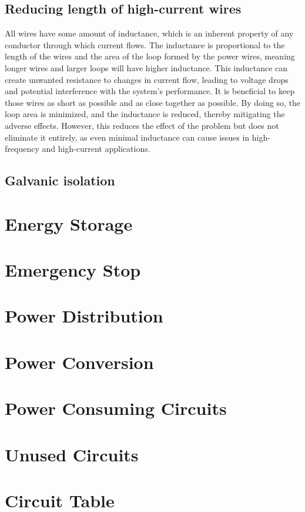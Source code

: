 \subsection{Reducing length of high-current wires}

All wires have some amount of inductance, which is an inherent property of any conductor through which current flows. The inductance is proportional to the length of the wires and the area of the loop formed by the power wires, meaning longer wires and larger loops will have higher inductance. This inductance can create unwanted resistance to changes in current flow, leading to voltage drops and potential interference with the system's performance. It is beneficial to keep those wires as short as possible and as close together as possible. By doing so, the loop area is minimized, and the inductance is reduced, thereby mitigating the adverse effects. However, this reduces the effect of the problem but does not eliminate it entirely, as even minimal inductance can cause issues in high-frequency and high-current applications.

\subsection{Galvanic isolation}




\section{Energy Storage}

\section{Emergency Stop}

\section{Power Distribution}

\section{Power Conversion}

\section{Power Consuming Circuits}

\section{Unused Circuits}

\section{Circuit Table}




